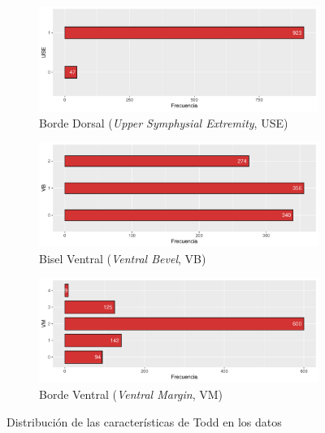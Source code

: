 \begin{figure}[p]
    \ContinuedFloat

    \begin{subfigure}{\textwidth}
        \includegraphics[width=\linewidth]{../../scripts/eda/eda_univar/char_use_distr.pdf}
        \caption{Borde Dorsal (\textit{Upper Symphysial Extremity}, USE)}
        \label{fig4:todd_chars__use}
    \end{subfigure}

    \begin{subfigure}{\textwidth}
        \includegraphics[width=\linewidth]{../../scripts/eda/eda_univar/char_vb_distr.pdf}
        \caption{Bisel Ventral (\textit{Ventral Bevel}, VB)}
        \label{fig4:todd_chars__vb}
    \end{subfigure}

    \begin{subfigure}{\textwidth}
        \includegraphics[width=\linewidth]{../../scripts/eda/eda_univar/char_vm_distr.pdf}
        \caption{Borde Ventral (\textit{Ventral Margin}, VM)}
        \label{fig4:todd_chars__vm}
    \end{subfigure}
    \caption[Distribución de las características de Todd]{Distribución de las características de Todd en los datos}

\end{figure}

